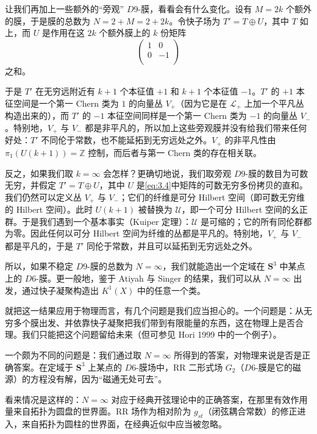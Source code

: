 让我们再加上一些额外的“旁观” \(D9\)-膜，看看会有什么变化。设有 \(M=2k\) 个额外的膜，于是膜的总数为 \(N=2+M=2+2k\)。令快子场为 \(T'=T\oplus U\)，其中 \(T\) 如上，而 \(U\) 是作用在这 \(2k\) 个额外膜上的 \(k\) 份矩阵 \begin{equation}\tag{3.4}\label{eq:3.4}
\left(\begin{matrix}1 & 0 \\ 0 & -1\\\end{matrix}\right)
\end{equation} 之和。

于是 \(T'\) 在无穷远附近有 \(k+1\) 个本征值 \(+1\) 和 \(k+1\) 个本征值 \(-1\)。\(T'\) 的 \(+1\) 本征空间是一个第一 Chern 类为 \(1\) 的向量丛 \(V_+\)（因为它是在 \({\mathcal L}_+\) 上加一个平凡丛构造出来的），而 \(T'\) 的 \(-1\) 本征空间同样是一个第一 Chern 类为 \(-1\) 的向量丛 \(V_-\)。特别地，\(V_+\) 与 \(V_-\) 都是非平凡的，所以加上这些旁观膜并没有给我们带来任何好处：\(T'\) 不同伦于常数，也不能延拓到无穷远处之外。\(V_+\) 的非平凡性由 \(\pi_1(U(k+1))=\mathbb{Z}\) 控制，而后者与第一 Chern 类的存在相关联。

反之，如果我们取 \(k=\infty\) 会怎样？更确切地说，我们取旁观 \(D9\)-膜的数目为可数无穷，并假定 \(T'=T\oplus U\)，其中 \(U\) 是\eqref{eq:3.4}中矩阵的可数无穷多份拷贝的直和。我们仍然可以定义丛 \(V_+\) 与 \(V_-\)；它们的纤维是可分 Hilbert 空间（即可数无穷维的 Hilbert 空间）。此时 \(U(k+1)\) 被替换为 \({\mathcal U}\)，即一个可分 Hilbert 空间的幺正群。于是我们遇到一个基本事实（Kuiper 定理）：\({\mathcal U}\) 是可缩的；它的所有同伦群都为零。因此任何以可分 Hilbert 空间为纤维的丛都是平凡的。特别地，\(V_+\) 与 \(V_-\) 都是平凡的，于是 \(T'\) 同伦于常数，并且可以延拓到无穷远处之外。

所以，如果不稳定 \(D9\)-膜的总数为 \(N=\infty\)，我们就能造出一个定域在 \({\mathbf S}^3\) 中某点上的 \(D6\)-膜。更一般地，鉴于 Atiyah 与 Singer 的结果，我们可以从 \(N=\infty\) 出发，通过快子凝聚构造出 \(K^1(X)\) 中的任意一个类。

就把这一结果应用于物理而言，有几个问题是我们应当担心的。一个问题是：从无穷多个膜出发、并依靠快子凝聚把我们带到有限能量的东西，这在物理上是否合理。我们只能把这个问题留给未来（但可参见 Hori 1999 中的一个例子）。

一个颇为不同的问题是：我们通过取 \(N=\infty\) 所得到的答案，对物理来说是否是正确答案。在定域于 \({\mathbf S}^3\) 上某点的 \(D6\)-膜场中，RR 二形式场 \(G_2\)（\(D6\)-膜是它的磁源）的方程没有解，因为“磁通无处可去”。

看来情况是这样的：\(N=\infty\) 对应于经典开弦理论中的正确答案，在那里有效作用量来自拓扑为圆盘的世界面。RR 场作为相对阶为 \(g_{st}\)（闭弦耦合常数）的修正进入，来自拓扑为圆柱的世界面，在经典近似中应当被忽略。

